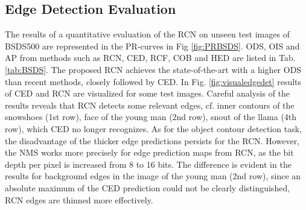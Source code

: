 \documentclass[runningheads]{llncs}
\begin{document}
\subsection{Edge Detection Evaluation}
The results of a quantitative evaluation of the RCN on unseen test images of BSDS500 are represented in the PR-curves in Fig \ref{fig:PRBSDS}. ODS, OIS and AP from methods such as RCN, CED, RCF, COB and HED are listed in Tab. \ref{tab:BSDS}. The proposed RCN achieves the state-of-the-art with a higher ODS than recent methods, closely followed by CED. In Fig. \ref{fig:visualedgedet} results of CED and RCN are visualized for some test images. Careful analysis of the results reveals that RCN detects some relevant edges, cf. inner contours of the snowshoes (1st row), face of the young man (2nd row), snout of the llama (4th row), which CED no longer recognizes. As for the object contour detection task, the disadvantage of the thicker edge predictions persists for the RCN. However, the NMS works more precisely for edge prediction maps from RCN, as the bit depth per pixel is increased from 8 to 16 bits. The difference is evident in the results for background edges in the image of the young man (2nd row), since an absolute maximum of the CED prediction could not be clearly distinguished, RCN edges are thinned more effectively.
\end{document}
